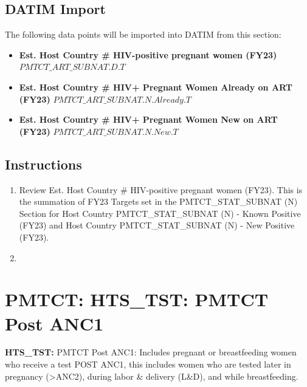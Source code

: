 \documentclass[
  openany]{book}
\begin{document}
\hypertarget{datim-import-19}{%
\subsection{DATIM Import}\label{datim-import-19}}

The following data points will be imported into DATIM from this section:

\begin{itemize}
\item
  \textbf{Est. Host Country \# HIV-positive pregnant women (FY23)}
  \(PMTCT\_ART\_SUBNAT.D.T\)
\item
  \textbf{Est. Host Country \# HIV+ Pregnant Women Already on ART (FY23)}
  \(PMTCT\_ART\_SUBNAT.N.Already.T\)
\item
  \textbf{Est. Host Country \# HIV+ Pregnant Women New on ART (FY23)}
  \(PMTCT\_ART\_SUBNAT.N.New.T\)
\end{itemize}

\hypertarget{instructions-19}{%
\subsection{Instructions}\label{instructions-19}}

\begin{enumerate}
\def\labelenumi{\arabic{enumi}.}
\item
  Review Est. Host Country \# HIV-positive pregnant women (FY23). This
  is the summation of FY23 Targets set in the PMTCT\_STAT\_SUBNAT (N)
  Section for Host Country PMTCT\_STAT\_SUBNAT (N) - Known Positive
  (FY23) and Host Country PMTCT\_STAT\_SUBNAT (N) - New Positive (FY23).
\item
\end{enumerate}

\hypertarget{pmtct-hts_tst-pmtct-post-anc1}{%
\section{PMTCT: HTS\_TST: PMTCT Post ANC1}\label{pmtct-hts_tst-pmtct-post-anc1}}

\textbf{HTS\_TST:} PMTCT Post ANC1: Includes pregnant or breastfeeding women
who receive a test POST ANC1, this includes women who are tested later
in pregnancy (\textgreater ANC2), during labor \& delivery (L\&D), and while
breastfeeding.
\end{document}
